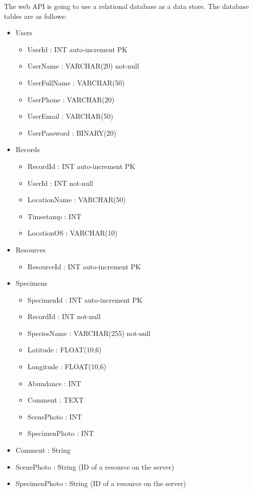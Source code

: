         The web API is going to use a relational database as a data store.
        The database tables are as follows:

        \begin{itemize}
            \item Users
            \begin{itemize}
                \item UserId : INT auto-increment PK
                \item UserName : VARCHAR(20) not-null
                \item UserFullName : VARCHAR(50)
                \item UserPhone : VARCHAR(20)
                \item UserEmail : VARCHAR(50)
                \item UserPassword : BINARY(20)
            \end{itemize}
                
            \item Records
            \begin{itemize}
                \item RecordId : INT auto-increment PK
                \item UserId : INT not-null
                \item LocationName : VARCHAR(50)
                \item Timestamp : INT
                \item LocationOS : VARCHAR(10)
            \end{itemize}
                
            \item Resources
            \begin{itemize}
                \item ResourceId : INT auto-increment PK
            \end{itemize}

            \item Specimens
            \begin{itemize}
                \item SpecimenId : INT auto-increment PK
                \item RecordId : INT not-null
                \item SpeciesName : VARCHAR(255) not-null
                \item Latitude : FLOAT(10,6)
                \item Longitude : FLOAT(10,6)
                \item Abundance : INT
                \item Comment : TEXT
                \item ScenePhoto : INT
                \item SpecimenPhoto : INT   
            \end{itemize}
                \item Comment : String
                \item ScenePhoto : String (ID of a resource on the server)
                \item SpecimenPhoto : String (ID of a resource on the server)
            \end{itemize}
